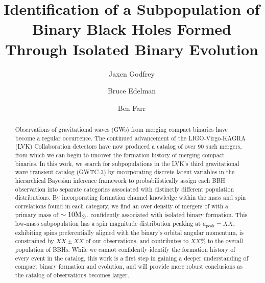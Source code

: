 \documentclass[twocolumn, linenumbers]{aastex631}
\newcommand{\msun}{\ensuremath{{\rm M}_\odot}}
\begin{document}
\title{Identification of a Subpopulation of Binary Black Holes Formed Through Isolated Binary Evolution}

\author{Jaxen Godfrey}
\author{Bruce Edelman}
\author{Ben Farr}

\begin{abstract}
    Observations of gravitational waves (GWs) from merging compact binaries have become a regular occurrence. The continued advancement of the LIGO-Virgo-KAGRA (LVK) Collaboration detectors have now produced a catalog of over 90 such mergers, from which we can begin to uncover the formation history of merging compact binaries. In this work, we search for subpopulations in the LVK's third gravitational wave transient catalog (GWTC-3) by incorporating discrete latent variables in the hierarchical Bayesian inference framework to probabilistically assign each BBH observation into separate categories associated with distinctly different population distributions. By incorporating formation channel knowledge within the mass and spin correlations found in each category, we find an over density of mergers of with a primary mass of $\sim10\msun$, confidently associated with isolated binary formation. This low-mass subpopulation has a spin magnitude distribution peaking at $a_\mathrm{peak}=XX$, exhibiting spins preferentially aligned with the binary's orbital angular momentum, is constrained by $XX \pm XX$ of our observations, and contributes to $XX\%$ to the overall population of BBHs. While we cannot confidently identify the formation history of every event in the catalog, this work is a first step in gaining a deeper understanding of compact binary formation and evolution, and will provide more robust conclusions as the catalog of observations becomes larger. 
\end{abstract}





\end{document}
